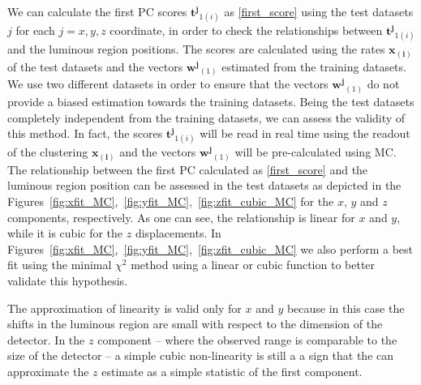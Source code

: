  We can calculate the first PC scores $\mathbf{t^j}_{1(i)}$ as \eqref{first_score} using the test datasets $j$ for each $j=x,y,z$ coordinate, in order to check the relationships between $\mathbf{t^{j}}_{1(i)}$ and the luminous region positions. The scores are calculated using the rates $\mathbf{x_{(i)}}$ of the test datasets and the vectors $\mathbf{w^{j}}_{(1)}$ estimated from the training datasets. We use two different datasets in order to ensure that the vectors $\mathbf{w^{j}}_{(1)}$ do not provide a biased estimation towards the training datasets. Being the test datasets completely independent from the training datasets, we can assess the validity of this method. In fact, the scores $\mathbf{t^{j}}_{1(i)}$ will be read in real time using the readout of the clustering $\mathbf{x_{(i)}}$ and the vectors $\mathbf{w^{j}}_{(1)}$ will be pre-calculated using MC. The relationship between the first PC calculated as \eqref{first_score} and the luminous region position can be assessed in the test datasets as depicted in the Figures~\ref{fig:xfit_MC},~\ref{fig:yfit_MC},~\ref{fig:zfit_cubic_MC} for the $x$, $y$ and $z$ components, respectively. As one can see, the relationship is linear for $x$ and $y$, while it is cubic for the $z$ displacements. In Figures~\ref{fig:xfit_MC},~\ref{fig:yfit_MC},~\ref{fig:zfit_cubic_MC} we also perform a best fit using the minimal $\chi^2$ method using a linear or cubic function to better validate this hypothesis. 

The approximation of linearity is valid only for $x$ and $y$ because in this case the shifts in the luminous region are small with respect to the dimension of the detector. In the $z$ component -- where the observed range is comparable to the size of the detector -- a simple cubic non-linearity is still a a sign that the can approximate the $z$ estimate as a simple statistic of the first component. 



